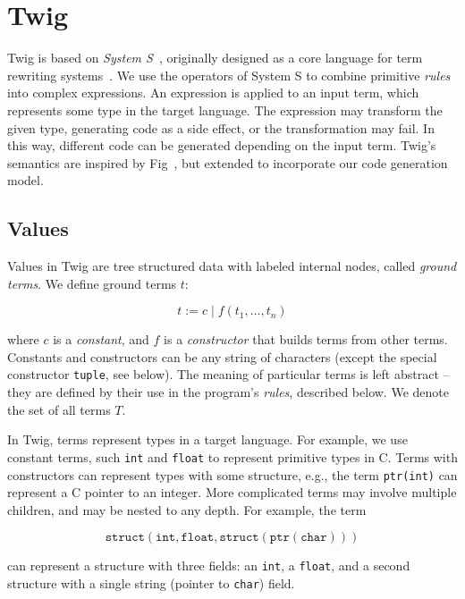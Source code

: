 
\section{Twig}
\label{sec:semantics}

Twig is based on \emph{System S}~\cite{system-s}, originally
designed as a core language for term rewriting
systems~\cite{baader98rewriting}. We use the operators of System S
to combine primitive \emph{rules} into complex expressions. An
expression is applied to an input term, which represents some type
in the target language. The expression may transform the given
type, generating code as a side effect, or the transformation may
fail. In this way, different code can be generated depending on
the input term. Twig's semantics are inspired by Fig~\cite{fig},
but extended to incorporate our code generation model.

\subsection{Values}

Values in Twig are tree structured data with labeled internal
nodes, called \emph{ground terms}. We define ground terms $t$:

\[
t \;\mbox{:=}\; c \;|\; f(t_1,\ldots,t_n)
\]

where $c$ is a \emph{constant}, and $f$ is a \emph{constructor}
that builds terms from other terms. Constants and constructors can
be any string of characters (except the special constructor
\texttt{tuple}, see below). The meaning of particular terms is
left abstract -- they are defined by their use in the program's
\emph{rules}, described below. We denote the set of all terms $T$.

In Twig, terms represent types in a target language. For example,
we use constant terms, such \texttt{int} and \texttt{float} to
represent primitive types in C. Terms with constructors can
represent types with some structure, e.g., the term
\texttt{ptr(int)} can represent a C pointer to an integer. More
complicated terms may involve multiple children, and may be nested
to any depth. For example, the term

\[
\mathtt{struct(int,float,struct(ptr(char)))}
\]

can represent a structure with three fields: an \texttt{int}, a
\texttt{float}, and a second structure with a single string
(pointer to \texttt{char}) field.

